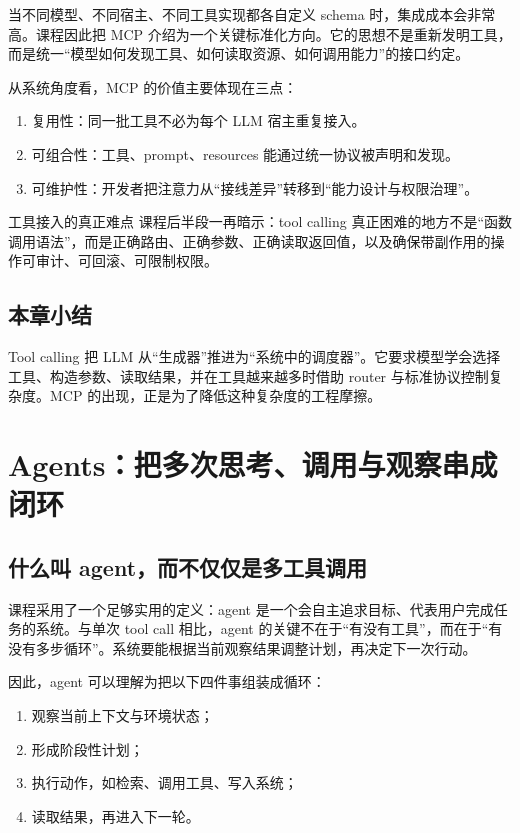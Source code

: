 \documentclass[a4paper]{article}
\begin{document}
当不同模型、不同宿主、不同工具实现都各自定义 schema 时，集成成本会非常高。课程因此把 MCP 介绍为一个关键标准化方向。它的思想不是重新发明工具，而是统一“模型如何发现工具、如何读取资源、如何调用能力”的接口约定。

从系统角度看，MCP 的价值主要体现在三点：

\begin{enumerate}
\item 复用性：同一批工具不必为每个 LLM 宿主重复接入。
\item 可组合性：工具、prompt、resources 能通过统一协议被声明和发现。
\item 可维护性：开发者把注意力从“接线差异”转移到“能力设计与权限治理”。
\end{enumerate}

\begin{warningbox}{工具接入的真正难点}
课程后半段一再暗示：tool calling 真正困难的地方不是“函数调用语法”，而是正确路由、正确参数、正确读取返回值，以及确保带副作用的操作可审计、可回滚、可限制权限。
\end{warningbox}

\subsection{本章小结}

Tool calling 把 LLM 从“生成器”推进为“系统中的调度器”。它要求模型学会选择工具、构造参数、读取结果，并在工具越来越多时借助 router 与标准协议控制复杂度。MCP 的出现，正是为了降低这种复杂度的工程摩擦。

\section{Agents：把多次思考、调用与观察串成闭环}

\subsection{什么叫 agent，而不仅仅是多工具调用}

课程采用了一个足够实用的定义：agent 是一个会自主追求目标、代表用户完成任务的系统。与单次 tool call 相比，agent 的关键不在于“有没有工具”，而在于“有没有多步循环”。系统要能根据当前观察结果调整计划，再决定下一次行动。

因此，agent 可以理解为把以下四件事组装成循环：

\begin{enumerate}
\item 观察当前上下文与环境状态；
\item 形成阶段性计划；
\item 执行动作，如检索、调用工具、写入系统；
\item 读取结果，再进入下一轮。
\end{enumerate}
\end{document}
